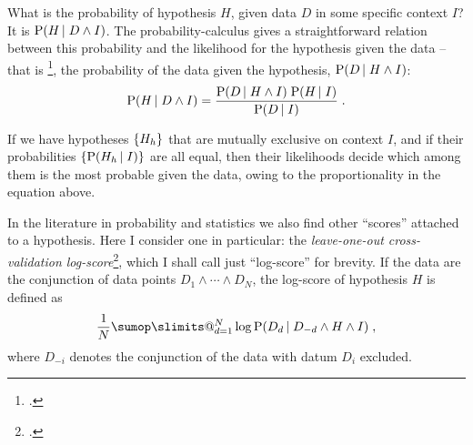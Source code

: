 \documentclass[\ifafour a4paper,12pt,\else a5paper,10pt,\fi%
onecolumn,oneside,article,%
british%
]{memoir}
\makeatletter
\theoremstyle{remark}
\theoremstyle{innote}
\def\sum{\DOTSI\sumop\slimits@}
\newcommand*{\citep}{\footcites}
\DeclarePairedDelimiter\set{\{}{\}}
\newcommand*{\p}{\mathrm{P}}%
\renewcommand*{\|}[1][]{\nonscript\,#1\vert\nonscript\;\mathopen{}}
\newcommand*{\sect}{\S}%
\newcommand*{\sects}{\S\S}%
\newcommand*{\yK}{I}
\makeatother
\begin{document}
What is the probability of hypothesis $H$, given data $D$ in some specific
context $\yK$? \; It is $\p(H \| D \land \yK)$. The probability-calculus
gives a straightforward relation between this probability and the
likelihood for the hypothesis given the data -- that is \citep[\sect~6.1
p.~62]{good1950}, the probability of the data given the hypothesis,
$\p(D \| H \land \yK)$:
\begin{equation}
  \label{eq:posterior_hypothesis_universal}
  \p(H \| D \land \yK) = \frac{\p(D \| H \land \yK)\;\p(H \| \yK)}{\p(D \| \yK)} \;.
\end{equation}

If we have hypotheses $\set{H_{h}}$ that are mutually exclusive on context
$\yK$, and if their probabilities $\set{\p(H_{h} \| \yK)}$ are all equal,
then their likelihoods decide which among them is the most probable given
the data, owing to the proportionality in the equation above.

In the literature in probability and statistics we also find other
\enquote{scores} attached to a hypothesis. Here I consider one in
particular: the \emph{leave-one-out cross-validation
  log-score}\citep[\sects~3.4, 6.1.6]{bernardoetal1994_r2000}[see
also][]{stone1977,geisseretal1979,vehtarietal2012,vehtarietal2002,krnjajicetal2011,krnjajicetal2014,gelmanetal2014,gronauetal2019,chandramoulietal2019},
which I shall call just \enquote{log-score} for brevity. If the data are
the conjunction of data points $D_{1} \land \dotsb \land D_{N}$, the
log-score of hypothesis $H$ is defined as
\begin{equation}
  \label{eq:log-score}
  \frac{1}{N} \sum_{d=1}^{N} \log\p(D_{d} \| D_{-d} \land H \land \yK) \;,
\end{equation}
where $D_{-i}$ denotes the conjunction of the data with datum $D_{i}$
excluded.
\end{document}
